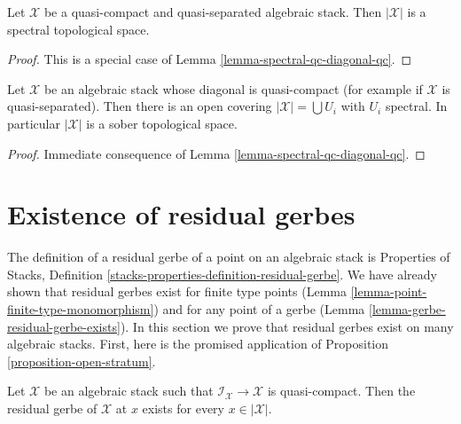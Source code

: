 \begin{lemma}
\label{lemma-spectral-qcqs}
Let $\mathcal{X}$ be a quasi-compact and quasi-separated algebraic stack.
Then $|\mathcal{X}|$ is a spectral topological space.
\end{lemma}

\begin{proof}
This is a special case of Lemma \ref{lemma-spectral-qc-diagonal-qc}.
\end{proof}

\begin{lemma}
\label{lemma-sober-qs}
Let $\mathcal{X}$ be an algebraic stack whose diagonal is quasi-compact
(for example if $\mathcal{X}$ is quasi-separated).
Then there is an open covering $|\mathcal{X}| = \bigcup U_i$
with $U_i$ spectral. In particular $|\mathcal{X}|$ is
a sober topological space.
\end{lemma}

\begin{proof}
Immediate consequence of Lemma \ref{lemma-spectral-qc-diagonal-qc}.
\end{proof}






\section{Existence of residual gerbes}
\label{section-existence-residual-gerbes}

\noindent
The definition of a residual gerbe of a point on an algebraic stack
is Properties of Stacks, Definition
\ref{stacks-properties-definition-residual-gerbe}.
We have already shown that residual gerbes exist for finite type
points (Lemma \ref{lemma-point-finite-type-monomorphism})
and for any point of a gerbe (Lemma \ref{lemma-gerbe-residual-gerbe-exists}).
In this section we prove that residual gerbes
exist on many algebraic stacks. First, here is the promised
application of
Proposition \ref{proposition-open-stratum}.

\begin{lemma}
\label{lemma-every-point-residual-gerbe}
Let $\mathcal{X}$ be an algebraic stack such that
$\mathcal{I}_\mathcal{X} \to \mathcal{X}$ is quasi-compact.
Then the residual gerbe of $\mathcal{X}$ at $x$ exists for
every $x \in |\mathcal{X}|$.
\end{lemma}

